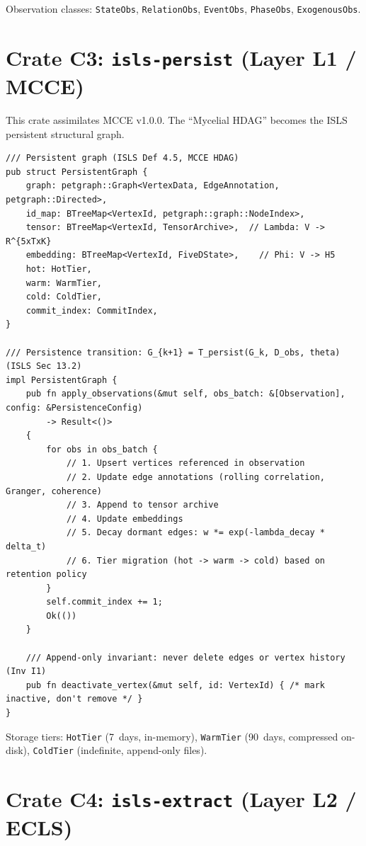\documentclass[10pt,a4paper]{article}
\theoremstyle{definition}\newtheorem{definition}{Def}[section]
\theoremstyle{plain}\newtheorem{theorem}{Thm}[section]
\newcommand{\crate}[1]{\texttt{\small\color{rustborder!80!black}#1}}
\newcommand{\ty}[1]{\texttt{\small\color{accent}#1}}
\begin{document}
Observation classes: \ty{StateObs}, \ty{RelationObs}, \ty{EventObs}, \ty{PhaseObs}, \ty{ExogenousObs}.

\section{Crate C3: \crate{isls-persist} (Layer L1 / MCCE)}
\label{sec:c3}

This crate assimilates MCCE v1.0.0. The ``Mycelial HDAG'' becomes the ISLS persistent structural graph.

\begin{lstlisting}[style=rust]
/// Persistent graph (ISLS Def 4.5, MCCE HDAG)
pub struct PersistentGraph {
    graph: petgraph::Graph<VertexData, EdgeAnnotation, petgraph::Directed>,
    id_map: BTreeMap<VertexId, petgraph::graph::NodeIndex>,
    tensor: BTreeMap<VertexId, TensorArchive>,  // Lambda: V -> R^{5xTxK}
    embedding: BTreeMap<VertexId, FiveDState>,    // Phi: V -> H5
    hot: HotTier,
    warm: WarmTier,
    cold: ColdTier,
    commit_index: CommitIndex,
}

/// Persistence transition: G_{k+1} = T_persist(G_k, D_obs, theta) (ISLS Sec 13.2)
impl PersistentGraph {
    pub fn apply_observations(&mut self, obs_batch: &[Observation], config: &PersistenceConfig)
        -> Result<()>
    {
        for obs in obs_batch {
            // 1. Upsert vertices referenced in observation
            // 2. Update edge annotations (rolling correlation, Granger, coherence)
            // 3. Append to tensor archive
            // 4. Update embeddings
            // 5. Decay dormant edges: w *= exp(-lambda_decay * delta_t)
            // 6. Tier migration (hot -> warm -> cold) based on retention policy
        }
        self.commit_index += 1;
        Ok(())
    }

    /// Append-only invariant: never delete edges or vertex history (Inv I1)
    pub fn deactivate_vertex(&mut self, id: VertexId) { /* mark inactive, don't remove */ }
}
\end{lstlisting}

Storage tiers: \ty{HotTier} (7~days, in-memory), \ty{WarmTier} (90~days, compressed on-disk), \ty{ColdTier} (indefinite, append-only files).

\section{Crate C4: \crate{isls-extract} (Layer L2 / ECLS)}
\label{sec:c4}
\end{document}
